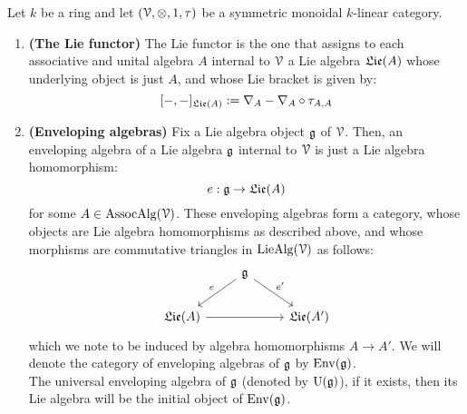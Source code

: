         \begin{definition} \label{def: enveloping_algebras}
            Let $k$ be a ring and let $(\calV, \tensor, 1, \tau)$ be a symmetric monoidal $k$-linear category.
                \begin{enumerate}
                    \item \textbf{(The Lie functor)} The Lie functor is the one that assigns to each associative and unital algebra $A$ internal to $\mathcal{V}$ a Lie algebra $\mathfrak{Lie}(A)$ whose underlying object is just $A$, and whose Lie bracket is given by:
                        $$[-,-]_{\mathfrak{Lie}(A)} := \nabla_A - \nabla_A \circ \tau_{A,A}$$
                    \item \textbf{(Enveloping algebras)} Fix a Lie algebra object $\mathfrak{g}$ of $\mathcal{V}$. Then, an enveloping algebra of a Lie algebra $\mathfrak{g}$ internal to $\mathcal{V}$ is just a Lie algebra homomorphism:
                        $$e: \mathfrak{g} \to \mathfrak{Lie}(A)$$
                    for some $A \in \mathrm{Assoc}\mathrm{Alg}(\mathcal{V})$. These enveloping algebras form a category, whose objects are Lie algebra homomorphisms as described above, and whose morphisms are commutative triangles in $\mathrm{Lie}\mathrm{Alg}(\mathcal{V})$ as follows:
                        $$
                            \begin{tikzcd}
                            	& {\g} \\
                            	{\frakLie(A)} && {\frakLie(A')}
                            	\arrow[from=2-1, to=2-3]
                            	\arrow["{e}"', from=1-2, to=2-1]
                            	\arrow["{e'}", from=1-2, to=2-3]
                            \end{tikzcd}
                        $$
                    which we note to be induced by algebra homomorphisms $A \to A'$. We will denote the category of enveloping algebras of $\mathfrak{g}$ by $\mathrm{Env}(\mathfrak{g})$. 
                    \\
                    The universal enveloping algebra of $\mathfrak{g}$ (denoted by $\mathrm{U}(\mathfrak{g})$), if it exists, then its Lie algebra will be the initial object of $\mathrm{Env}(\mathfrak{g})$. 
                \end{enumerate}
        \end{definition}
        
